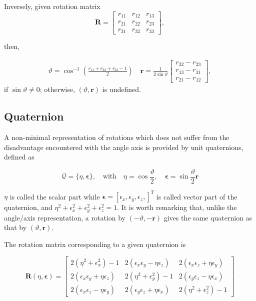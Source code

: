 \documentclass[10pt]{article}
\begin{document}
\bigskip
\noindent
Inversely, given rotation matrix
$$
\boldsymbol{R}=\left[\begin{array}{lll}
r_{11} & r_{12} & r_{13} \\
r_{21} & r_{22} & r_{23} \\
r_{31} & r_{32} & r_{33}
\end{array}\right],
$$

then, 

$$
\begin{aligned}
 \vartheta=\cos ^{-1}\left(\frac{r_{11}+r_{22}+r_{33}-1}{2}\right) \quad \boldsymbol{r}=\frac{1}{2 \sin \vartheta}\left[\begin{array}{l}
r_{32}-r_{23} \\
r_{13}-r_{31} \\
r_{21}-r_{12}
\end{array}\right],
\end{aligned}
$$
if $\sin \vartheta \neq 0$; otherwise, $(\vartheta, \boldsymbol{r})$ is undefined.

\subsection{Quaternion}
A non-minimal representation of rotations which does not suffer from the disadvantage encountered with the angle axis is provided by unit quaternions, 
defined as 

$$\mathcal{Q}=\{\eta, \boldsymbol{\epsilon}\}, \quad\text{with}
\quad
\eta=\cos \frac{\vartheta}{2}, \quad \boldsymbol{\epsilon}=\sin \frac{\vartheta}{2} \boldsymbol{r}
$$ 


$\eta$ is called the scalar part while $\boldsymbol{\epsilon}=\left[\epsilon_{x} , \epsilon_{y} , \epsilon_{z}, \right]^{T}$ is called  vector part of the quaternion, and $\eta^{2}+\epsilon_{x}^{2}+\epsilon_{y}^{2}+\epsilon_{z}^{2}=1$.
It is worth remarking that, unlike the angle/axis representation, a rotation by $(-\vartheta, -\boldsymbol{r})$ gives the same quaternion as that by $(\vartheta, \boldsymbol{r})$.


The rotation matrix corresponding to a given quaternion is

$$
\boldsymbol{R}(\eta, \boldsymbol{\epsilon})=\left[\begin{array}{ccc}
2\left(\eta^{2}+\epsilon_{x}^{2}\right)-1 & 2\left(\epsilon_{x} \epsilon_{y}-\eta \epsilon_{z}\right) & 2\left(\epsilon_{x} \epsilon_{z}+\eta \epsilon_{y}\right) \\
2\left(\epsilon_{x} \epsilon_{y}+\eta \epsilon_{z}\right) & 2\left(\eta^{2}+\epsilon_{y}^{2}\right)-1 & 2\left(\epsilon_{y} \epsilon_{z}-\eta \epsilon_{x}\right) \\
2\left(\epsilon_{x} \epsilon_{z}-\eta \epsilon_{y}\right) & 2\left(\epsilon_{y} \epsilon_{z}+\eta \epsilon_{x}\right) & 2\left(\eta^{2}+\epsilon_{z}^{2}\right)-1
\end{array}\right]
$$
\end{document}
